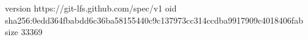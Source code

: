 version https://git-lfs.github.com/spec/v1
oid sha256:0edd364fbabdd6c36ba58155440c9c137973cc314ccdba9917909c4018406fab
size 33369
